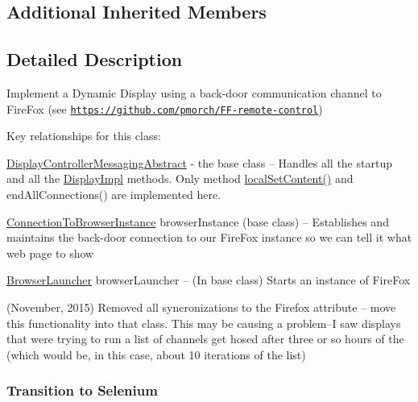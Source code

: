 \subsection*{Additional Inherited Members}


\subsection{Detailed Description}
Implement a Dynamic Display using a back-\/door communication channel to Fire\-Fox (see \href{https://github.com/pmorch/FF-remote-control}{\tt https\-://github.\-com/pmorch/\-F\-F-\/remote-\/control}) 

Key relationships for this class\-: 
\begin{DoxyItemize}
\item \hyperlink{classgov_1_1fnal_1_1ppd_1_1dd_1_1display_1_1client_1_1DisplayControllerMessagingAbstract}{Display\-Controller\-Messaging\-Abstract} -\/ the base class -- Handles all the startup and all the \hyperlink{classgov_1_1fnal_1_1ppd_1_1dd_1_1display_1_1DisplayImpl}{Display\-Impl} methods. Only method \hyperlink{classgov_1_1fnal_1_1ppd_1_1dd_1_1display_1_1client_1_1DisplayControllerMessagingAbstract_a24673e152db1bddd9927cbc266059b99}{local\-Set\-Content()} and end\-All\-Connections() are implemented here.


\item \hyperlink{classgov_1_1fnal_1_1ppd_1_1dd_1_1display_1_1client_1_1ConnectionToBrowserInstance}{Connection\-To\-Browser\-Instance} browser\-Instance (base class) -- Establishes and maintains the back-\/door connection to our Fire\-Fox instance so we can tell it what web page to show


\item \hyperlink{classgov_1_1fnal_1_1ppd_1_1dd_1_1display_1_1client_1_1BrowserLauncher}{Browser\-Launcher} browser\-Launcher -- (In base class) Starts an instance of Fire\-Fox 
\end{DoxyItemize}

(November, 2015) Removed all syncronizations to the Firefox attribute -- move this functionality into that class. This may be causing a problem--I saw displays that were trying to run a list of channels get hosed after three or so hours of the (which would be, in this case, about 10 iterations of the list) 

\subsubsection*{Transition to Selenium}

